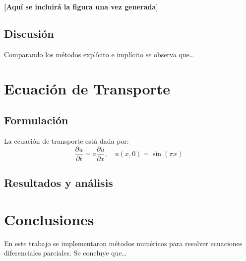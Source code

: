 \documentclass[12pt,a4paper]{article}
\begin{document}

\textbf{[Aquí se incluirá la figura una vez generada]}

\subsection{Discusión}
Comparando los métodos explícito e implícito se observa que\ldots

\section{Ecuación de Transporte}
\subsection{Formulación}
La ecuación de transporte está dada por:
\begin{equation}
    \frac{\partial u}{\partial t} = a \frac{\partial u}{\partial x}, \quad
    u(x,0) = \sin(\pi x)
\end{equation}

\subsection{Resultados y análisis}

\section{Conclusiones}
En este trabajo se implementaron métodos numéricos para resolver ecuaciones diferenciales parciales. 
Se concluye que\ldots
\end{document}
